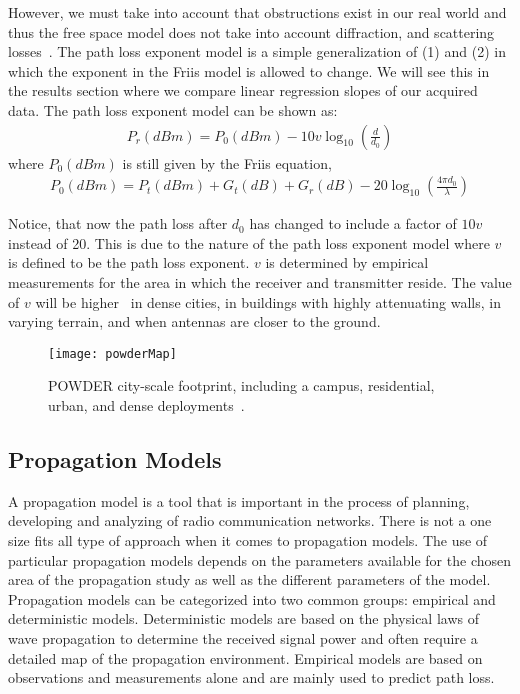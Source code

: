 However, we must take into account that obstructions exist in our real world and thus the free space model does not take into account
diffraction, and scattering losses~\cite{pathlossmodels}. The path loss exponent model is a simple generalization of (1) and (2) in which the 
exponent in the Friis model is allowed to change. We will see this in the results section where we compare linear regression slopes of 
our acquired data. The path loss exponent model can be shown as:
\begin{align}
P_r(dBm) = P_0(dBm) -10v\log_{10}(\frac{d}{d_0})
\end{align}
where $P_0 (dBm)$ is still given by the Friis equation,
\begin{align}
P_0(dBm) = P_t(dBm) + G_t(dB) + G_r(dB) - 20\log_{10}(\frac{4\pi d_0}{\lambda})
\end{align}

Notice, that now the path loss after $d_0$ has changed to include a factor of $10v$ instead of 20. This is due to the nature of the path loss
exponent model where $v$ is defined to be the path loss exponent. $v$ is determined by empirical measurements for the area in which 
the receiver and transmitter reside. The value of $v$ will be higher~\cite{pathlossmodels} in dense cities, in buildings with highly attenuating
walls, in varying terrain, and when antennas are closer to the ground. 

\begin{figure}
  \centering
  \texttt{[image: powderMap]}
  \caption{POWDER city-scale footprint, including a campus, residential, urban, and dense deployments~\cite{Breen+:wintech20}.}
  \label{fig:powdermap}
\end{figure}

\subsection*{Propagation Models}
A propagation model is a tool that is important in the process of planning, developing and analyzing of radio communication networks. 
There is not a one size fits all type of approach when it comes to propagation models. The use of particular propagation models depends
on the parameters available for the chosen area of the propagation study as well as the different parameters of the model. Propagation 
models can be categorized into two common groups: empirical and deterministic models. Deterministic models are based on the physical 
laws of wave propagation to determine the received signal power and often require a detailed map of the propagation environment. Empirical 
models are based on observations and measurements alone and are mainly used to predict path loss.

